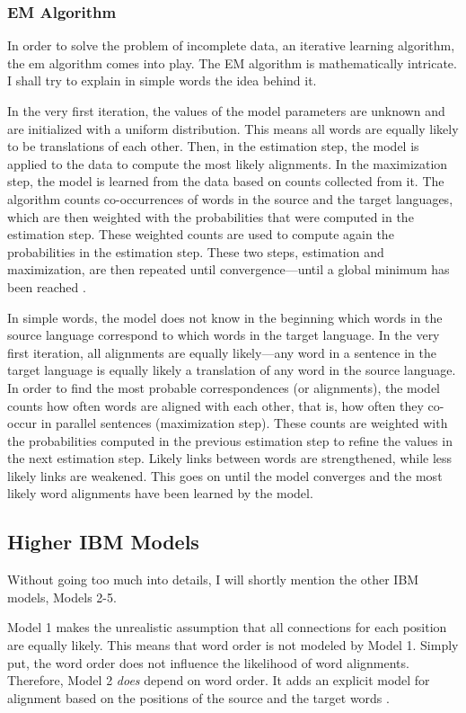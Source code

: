 \subsubsection{EM Algorithm} 
In order to solve the problem of incomplete data, an iterative learning algorithm, the \acrfull{em} algorithm comes into play. 
The EM algorithm is mathematically intricate. 
I shall try to explain in simple words the idea behind it. 

In the very first iteration, the values of the model parameters are unknown and are initialized with a uniform distribution. 
This means all words are equally likely to be translations of each other.
Then, in the estimation step, the model is applied to the data to compute the most likely alignments. 
In the maximization step, the model is learned from the data based on counts collected from it. 
The algorithm counts co-occurrences of words in the source and the target languages, which are then weighted with the probabilities that were computed in the estimation step.
These weighted counts are used to compute again the probabilities in the estimation step. 
These two steps, estimation and maximization, are then repeated until convergence---until a global minimum has been reached \autocites[88-92]{koehn2009}{brown-etal-1993-mathematics}.

In simple words, the model does not know in the beginning which words in the source language correspond to which words in the target language. 
In the very first iteration, all alignments are equally likely---any word in a sentence in the target language is equally likely a translation of any word in the source language.
In order to find the most probable correspondences (or alignments), the model counts how often words are aligned with each other, that is, how often they co-occur in parallel sentences (maximization step). 
These counts are weighted with the probabilities computed in the previous estimation step to refine the values in the next estimation step. 
Likely links between words are strengthened, while less likely links are weakened. 
This goes on until the model converges and the most likely word alignments have been learned by the model. 

\subsection{Higher IBM Models}
Without going too much into details, I will shortly mention the other IBM models, Models 2-5. 

Model 1 makes the unrealistic assumption that all connections for each position are equally likely. 
This means that word order is not modeled by Model 1. 
Simply put, the word order does not influence the likelihood of word alignments.
Therefore, Model 2 \emph{does} depend on word order. 
It adds an explicit model for alignment based on the positions of the source and the target words \autocites{brown-etal-1993-mathematics}[99]{koehn2009}.

